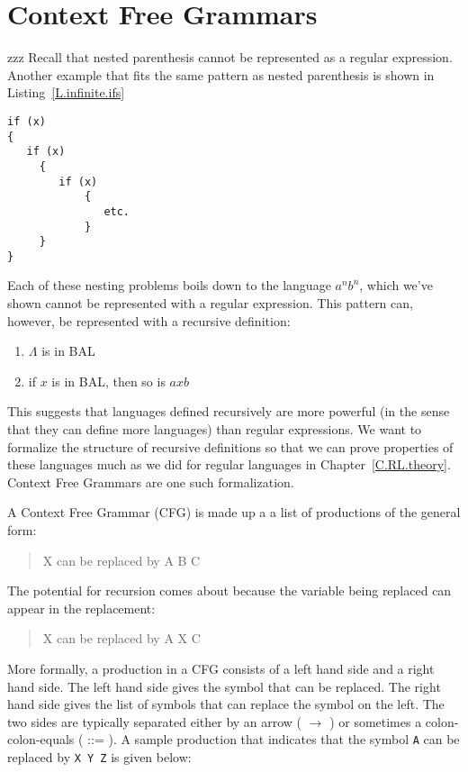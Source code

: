 \documentclass[letterpaper,12pt,openany,reqno]{book}%
\newcommand{\code}[1] {\lstinline[breaklines=yes,breakatwhitespace=yes]{#1}}
\begin{document}
\chapter{Context Free Grammars}
zzz
Recall that nested parenthesis cannot be represented as a regular expression. Another example that fits the same pattern as nested parenthesis is shown in Listing~\ref{L.infinite.ifs}
\begin{lstlisting}[caption={Nested if statements},label=L.infinite.ifs]
if (x)
{
   if (x)
	 {
	    if (x)
			{
			   etc.
			}
	 }
}
\end{lstlisting}
Each of these nesting problems boils down to the language $a^nb^n$, which we've shown cannot be represented with a regular expression. This pattern can, however, be represented with a recursive definition:
\begin{enumerate}
\item $\Lambda$ is in BAL
\item if $x$ is in BAL, then so is $axb$
\end{enumerate}

This suggests that languages defined recursively are more powerful (in the sense that they can define more languages) than regular expressions. We want to formalize the structure of recursive definitions so that we can prove properties of these languages much as we did for regular languages in Chapter~\ref{C.RL.theory}. Context Free Grammars are one such formalization.

A Context Free Grammar (CFG) is made up a a list of productions of the general form:

\begin{quote}
X can be replaced by A B C
\end{quote}

The potential for recursion comes about because the variable being replaced can appear in the replacement:
\begin{quote}
X can be replaced by A X C
\end{quote}

More formally, a production in a CFG consists of a left hand side and a right hand side. The left hand side gives the symbol that can be replaced. The right hand side gives the list of symbols that can replace the symbol on the left. The two sides are typically separated 
either by an arrow ( $\rightarrow$ ) 
or sometimes a colon-colon-equals ( ::= ). 
A sample production that indicates that the symbol \code{A} 
can be replaced by \code{X Y Z} is given below:
\end{document}
